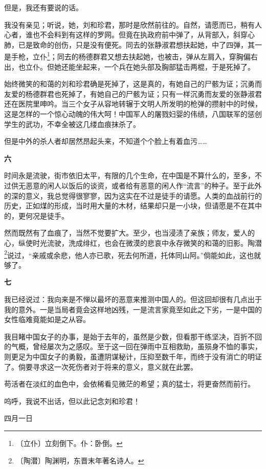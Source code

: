 \documentclass[12pt,UTF-8,openany]{ctexbook}
\begin{document}
\begin{large}
    但是，我还有要说的话。
    
    我没有亲见；听说，她，刘和珍君，那时是欣然前往的。自然，请愿而已，稍有人心者，谁也不会料到有这样的罗网。但竟在执政府前中弹了，从背部入，斜穿心肺，已是致命的创伤，只是没有便死。同去的张静淑君想扶起她，中了四弹，其一是手枪，立仆\footnote{〔立仆〕立刻倒下。仆：卧倒。}；同去的杨德群君又想去扶起她，也被击，弹从左肩入，穿胸偏右出，也立仆。但她还能坐起来，一个兵在她头部及胸部猛击两棍，于是死掉了。
    
    始终微笑的和蔼的刘和珍君确是死掉了，这是真的，有她自己的尸骸为证；沉勇而友爱的杨德群君也死掉了，有她自己的尸骸为证；只有一样沉勇而友爱的张静淑君还在医院里呻吟。当三个女子从容地转辗于文明人所发明的枪弹的攒射中的时候，这是怎样的一个惊心动魄的伟大呵！中国军人的屠戮妇婴的伟绩，八国联军的惩创学生的武功，不幸全被这几缕血痕抹杀了。
    
    但是中外的杀人者却居然昂起头来，不知道个个脸上有着血污……
    
    \begin{center}\textbf{六}\end{center}
    
    时间永是流驶，街市依旧太平，有限的几个生命，在中国是不算什么的，至多，不过供无恶意的闲人以饭后的谈资，或者给有恶意的闲人作“流言”的种子。至于此外的深的意义，我总觉得很寥寥，因为这实在不过是徒手的请愿。人类的血战前行的历史，正如煤的形成，当时用大量的木材，结果却只是一小块，但请愿是不在其中的，更何况是徒手。
    
    然而既然有了血痕了，当然不觉要扩大。至少，也当浸渍了亲族；师友，爱人的心，纵使时光流驶，洗成绯红，也会在微漠的悲哀中永存微笑的和蔼的旧影。陶潜\footnote{〔陶潜〕陶渊明，东晋末年著名诗人。}说过，“亲戚或余悲，他人亦已歌，死去何所道，托体同山阿。”倘能如此，这也就够了。
    
    \begin{center}\textbf{七}\end{center}
    
    我已经说过：我向来是不惮以最坏的恶意来推测中国人的。但这回却很有几点出于我的意外。一是当局者竟会这样地凶残，一是流言家竟至如此之下劣，一是中国的女性临难竟能如是之从容。
    
    我目睹中国女子的办事，是始于去年的，虽然是少数，但看那干练坚决，百折不回的气概，曾经屡次为之感叹。至于这一回在弹雨中互相救助，虽殒身不恤的事实，则更足为中国女子的勇毅，虽遭阴谋秘计，压抑至数千年，而终于没有消亡的明证了。倘要寻求这一次死伤者对于将来的意义，意义就在此罢。
    
    苟活者在淡红的血色中，会依稀看见微茫的希望；真的猛士，将更奋然而前行。
    
    呜呼，我说不出话，但以此记念刘和珍君！
    
    \hfill 四月一日
    
\end{large}
\end{document}
